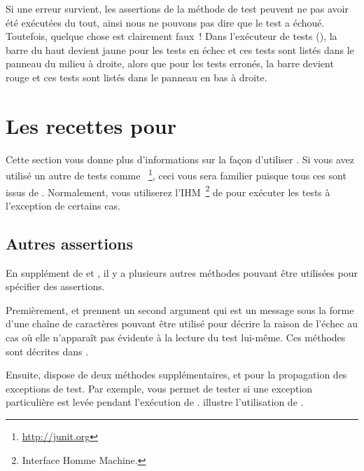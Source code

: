 \documentclass[a4paper,10pt,twoside]{book}
\begin{document}
Si une erreur survient, les assertions de la méthode de test peuvent ne pas 
avoir été exécutées du tout, ainsi nous ne pouvons pas dire que le test a échoué. 
Toutefois, quelque chose est clairement faux~!
Dans l'exécuteur de tests (), la barre du haut devient jaune pour les 
tests en échec et ces tests sont listés dans le panneau du milieu à droite, alors que 
pour les tests erronés, la barre devient rouge et ces tests sont listés dans le panneau 
en bas à droite.


\section{Les recettes pour \SUnit}
Cette section vous donne plus d'informations sur la façon d'utiliser \SUnit. Si vous avez 
utilisé un autre \framework de tests comme \JUnit~\footnote{\url{http://junit.org}}, ceci 
vous sera familier puisque tous ces \frameworks sont issus de  \SUnit. 
Normalement, vous utiliserez l'IHM~\footnote{Interface Homme Machine.} de \SUnit pour exécuter 
les tests à l'exception de certains cas.


\subsection{Autres assertions}
En supplément de  et , il y a plusieurs autres méthodes pouvant être utilisées 
pour spécifier des assertions.


Premièrement,  et  
prennent un second argument qui est un message sous la forme d'une chaîne de caractères pouvant 
être utilisé pour décrire la raison de l'échec au cas où elle n'apparaît pas évidente à la 
lecture du test lui-même. Ces méthodes sont décrites dans .


Ensuite, \sunit dispose de deux méthodes supplémentaires,  
et   pour la propagation des exceptions de test. 
Par exemple,  vous permet de tester si une 
exception particulière est levée pendant l'exécution de .  
illustre l'utilisation de \mbox{}.
\end{document}
